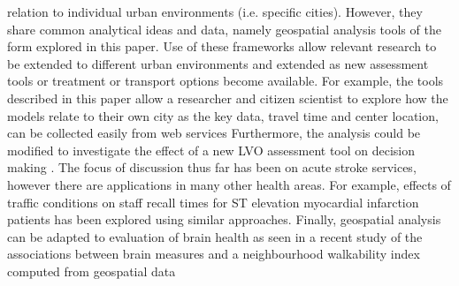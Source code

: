 \documentclass[utf8]{frontiersHLTH}
\begin{document}
relation to individual urban environments (i.e. specific
cities). However, they share common analytical ideas and data, namely
geospatial analysis tools of the form explored in this paper. Use of
these frameworks allow relevant research to be extended to different
urban environments and extended as new assessment tools or treatment
or transport options become available. For example, the tools
described in this paper allow a researcher and citizen scientist to
explore how the models relate to their own city as the key data,
travel time and center location, can be collected easily from web
services \cite{10.1001/jamaneurol.2018.2424,Milne_2017} Furthermore,
the analysis could be modified to investigate the effect of a new LVO
assessment tool on decision making
\cite{10.3389/fneur.2019.00130}. The focus of discussion thus far has
been on acute stroke services, however there are applications in many
other health areas. For example, effects of traffic conditions on
staff recall times for ST elevation myocardial infarction patients has
been explored using similar
approaches\cite{10.3389/fcvm.2017.00089}. Finally, geospatial analysis
can be adapted to evaluation of brain health as seen in a recent study
of the associations between brain measures and a neighbourhood
walkability index computed from geospatial data
\cite{cerin2017associations}
\end{document}
